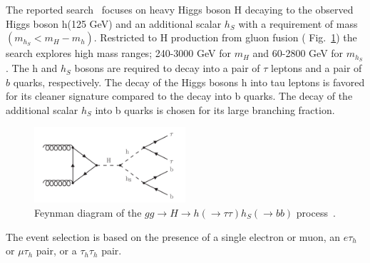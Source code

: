 \documentclass{blois}
\begin{document}
The reported search~\cite{CMS:tautaubb} focuses on heavy Higgs boson H decaying to the observed Higgs boson h(125 GeV) and an additional scalar $h_{S}$ with a requirement of mass $( m_{h_{S}} < m_{H} - m_{h} )$.
Restricted to H production from gluon fusion ( Fig.~\ref{fig:diagrams_tautaubb}) the search explores high mass ranges; 240-3000 GeV for $m_{H}$ and 60-2800 GeV for $m_{h_{S}}$. The h and $h_{S}$  bosons are required to decay into a pair of $\tau$ leptons and a pair of $b$ quarks, respectively. The decay of the Higgs bosons h into tau leptons is favored for its cleaner signature compared to the decay into b quarks. The decay of the additional scalar $h_{S}$ into b quarks is chosen for its large branching fraction.
\begin{figure}[!htb]
    \begin{center}
        \includegraphics[width=0.5\textwidth]{CMS-HIG-20-014_Figure_001.png}
        \caption{
           Feynman diagram of the $gg \rightarrow H \rightarrow h(\rightarrow \tau\tau)h_{S}(\rightarrow bb)$ process~\protect\cite{CMS:tautaubb}.
        }
        \label{fig:diagrams_tautaubb}
    \end{center}
\end{figure}
The event selection is based on the presence of a single electron or muon, an $e\tau_{h}$ or $\mu\tau_{h}$ pair, or a $\tau_{h}\tau_{h}$ pair. %
\end{document}
